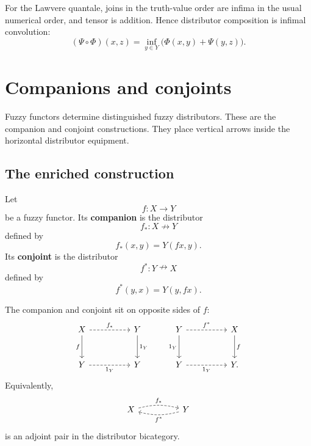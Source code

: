 \begin{example}
\label{ex:fuzzy-distributors-lawvere}
For the Lawvere quantale, joins in the truth-value order are infima in the usual
numerical order, and tensor is addition. Hence distributor composition is
infimal convolution:
\[
    (\Psi\circ\Phi)(x,z)
    =
    \inf_{y\in Y}
    \bigl(\Phi(x,y)+\Psi(y,z)\bigr).
\]
\end{example}

\section{Companions and conjoints}
\label{sec:companions-conjoints}

Fuzzy functors determine distinguished fuzzy distributors. These are the
companion and conjoint constructions. They place vertical arrows inside the
horizontal distributor equipment.

\subsection{The enriched construction}
\label{subsec:companions-conjoints-enriched}

\begin{definition}
\label{def:companion-conjoint}
Let
\[
    f:X\to Y
\]
be a fuzzy functor. Its \textbf{companion} is the distributor
\[
    f_\ast:X\nrightarrow Y
\]
defined by
\[
    f_\ast(x,y)=Y(fx,y).
\]
Its \textbf{conjoint} is the distributor
\[
    f^\ast:Y\nrightarrow X
\]
defined by
\[
    f^\ast(y,x)=Y(y,fx).
\]
\end{definition}

The companion and conjoint sit on opposite sides of \(f\):
\[
\begin{tikzcd}[column sep=huge,row sep=large]
X
    \ar[d,"f"']
    \ar[r,dashed,"f_\ast"]
&
Y
    \ar[d,"1_Y"]
\\
Y
    \ar[r,dashed,"1_Y"']
&
Y
\end{tikzcd}
\qquad
\begin{tikzcd}[column sep=huge,row sep=large]
Y
    \ar[d,"1_Y"']
    \ar[r,dashed,"f^\ast"]
&
X
    \ar[d,"f"]
\\
Y
    \ar[r,dashed,"1_Y"']
&
Y.
\end{tikzcd}
\]
Equivalently,
\[
\begin{tikzcd}[column sep=huge,row sep=large]
X
    \ar[r,bend left=14,dashed,"f_\ast"]
&
Y
    \ar[l,bend left=14,dashed,"f^\ast"]
\end{tikzcd}
\]
is an adjoint pair in the distributor bicategory.

